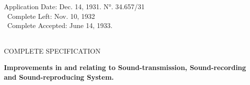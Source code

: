 \documentclass[11pt]{article}
\begin{document}
\begin{minipage}{0.9\linewidth}
\vspace{0.3cm}
\begin{center}

Application Date: Dec. 14, 1931. N°. 34.657/31\\\
Complete Left: Nov. 10, 1932\\\
Complete Accepted: June 14, 1933.\\\

COMPLETE SPECIFICATION

\end{center}

\end{minipage}

\vspace{1cm}

\begin{minipage}{0.95\linewidth}
\begin{center}
{\Large{\textbf{\textsf{Improvements in and relating to Sound-transmission, 
Sound-recording and Sound-reproducing System.}}}} \\

\end{center}
\end{minipage}
\vspace*{0.8cm}


\end{document}
